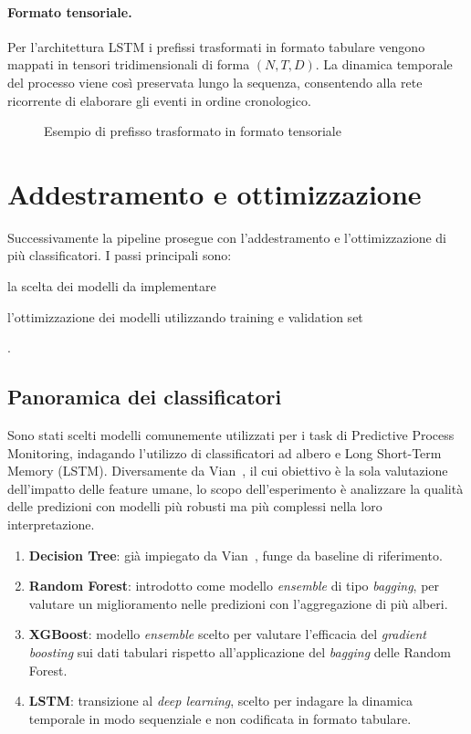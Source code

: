 \paragraph{Formato tensoriale.}
Per l'architettura LSTM i prefissi trasformati in formato tabulare vengono mappati in tensori tridimensionali di forma $(N, T, D)$. La dinamica temporale del processo viene così preservata lungo la sequenza, consentendo alla rete ricorrente di elaborare gli eventi in ordine cronologico.
\begin{figure}[H]
    \centering
    
    \caption{Esempio di prefisso trasformato in formato tensoriale}
    \label{fig:tensor_format}
\end{figure}

\section{Addestramento e ottimizzazione}
\label{sec:training_optimization}
Successivamente la pipeline prosegue con l'addestramento e l'ottimizzazione di più classificatori. I passi principali sono:
\begin{enumerate*}[label=(\roman*)]
    \item la scelta dei modelli da implementare
    \item l'ottimizzazione dei modelli utilizzando training e validation set
\end{enumerate*}.


\subsection{Panoramica dei classificatori}
\label{subsec:classifiers_overview}
Sono stati scelti modelli comunemente utilizzati per i task di Predictive Process Monitoring, indagando l'utilizzo di classificatori ad albero e Long Short-Term Memory (LSTM). Diversamente da Vian~\cite{ppm-human-centered-vian2024}, il cui obiettivo è la sola valutazione dell'impatto delle feature umane, lo scopo dell'esperimento è analizzare la qualità delle predizioni con modelli più robusti ma più complessi nella loro interpretazione.

\begin{enumerate}
    \item \textbf{Decision Tree}: già impiegato da Vian~\cite{ppm-human-centered-vian2024}, funge da baseline di riferimento.
    \item \textbf{Random Forest}: introdotto come modello \textit{ensemble} di tipo \textit{bagging}, per valutare un miglioramento nelle predizioni con l'aggregazione di più alberi.
    \item \textbf{XGBoost}: modello \textit{ensemble} scelto per valutare l'efficacia del \textit{gradient boosting} sui dati tabulari rispetto all'applicazione del \textit{bagging} delle Random Forest.
    \item \textbf{LSTM}: transizione al \textit{deep learning}, scelto per indagare la dinamica temporale in modo sequenziale e non codificata in formato tabulare.
\end{enumerate}

